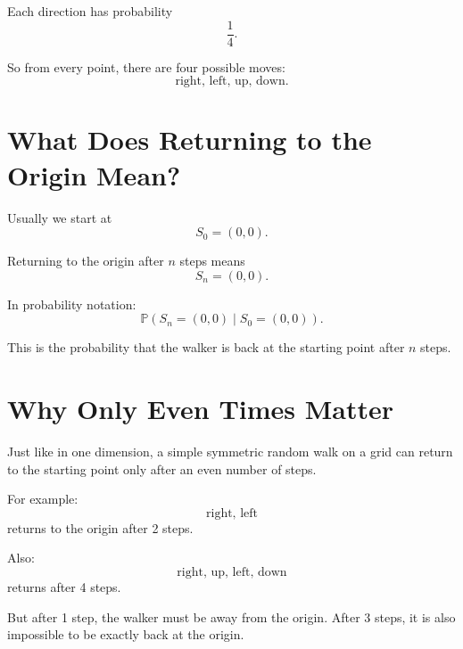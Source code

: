 \documentclass[12pt,a4paper]{article}
\theoremstyle{notestyle}
\newcommand{\Prob}{\mathbb{P}}
\begin{document}
Each direction has probability
\[
\frac14.
\]

\begin{center}
\end{center}

So from every point, there are four possible moves:
\[
\text{right, left, up, down}.
\]

\section{What Does Returning to the Origin Mean?}

Usually we start at
\[
S_0=(0,0).
\]

Returning to the origin after $n$ steps means
\[
S_n=(0,0).
\]

In probability notation:
\[
\Prob(S_n=(0,0)\mid S_0=(0,0)).
\]

This is the probability that the walker is back at the starting point after $n$ steps.

\section{Why Only Even Times Matter}

Just like in one dimension, a simple symmetric random walk on a grid can return to the starting point only after an even number of steps.

For example:
\[
\text{right, left}
\]
returns to the origin after 2 steps.

Also:
\[
\text{right, up, left, down}
\]
returns after 4 steps.

But after 1 step, the walker must be away from the origin. After 3 steps, it is also impossible to be exactly back at the origin.
\end{document}
